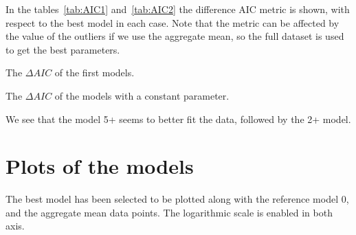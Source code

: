 \documentclass[a4paper]{article}
\begin{document}
In the tables~\ref{tab:AIC1} and~\ref{tab:AIC2} the difference AIC metric is 
shown, with respect to the best model in each case. Note that the metric can be 
affected by the value of the outliers if we use the aggregate mean, so the full 
dataset is used to get the best parameters.
%
\begin{table}[h]
	\centering
	
	\caption{The $\Delta AIC$ of the first models.}
	\label{tab:AIC1}
\end{table}
%
\begin{table}[h]
	\centering
	
	\caption{The $\Delta AIC$ of the models with a constant parameter.}
	\label{tab:AIC2}
\end{table}
%
We see that the model 5+ seems to better fit the data, followed by the 2+ model.

\section{Plots of the models}

The best model has been selected to be plotted along with the reference model 0, 
and the aggregate mean data points. The logarithmic scale is enabled in both 
axis.
\end{document}
